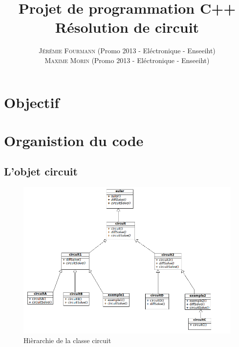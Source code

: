 \documentclass[a4paper,11pt]{article}
\title{\textbf{ \huge{Projet de programmation C++}} \\{\Large  Résolution de circuit}}
\author{
\textsc{Jérémie Fourmann} (Promo 2013 - Eléctronique - Enseeiht)\\ %
\textsc{Maxime Morin} (Promo 2013 - Eléctronique - Enseeiht)\\ %
}
\begin{document}
\pagestyle{plain}

\maketitle
\vspace{1cm}
\renewcommand{\contentsname}{Plan}
\tableofcontents
\vspace{2cm}



\newpage



\section{Objectif}
\section{Organistion du code}
  \subsection{L'objet circuit}
    \begin{figure}[H]
	 \begin{center}
	  \includegraphics[scale=.7]{circuitDiagram}
	\caption{Hièrarchie de la classe circuit}
	\end{center}
      \end{figure}
\end{document}
